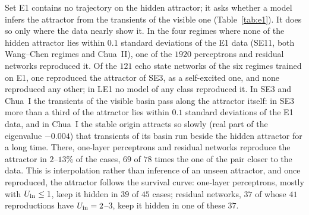 Set E1 contains no trajectory on the hidden attractor; it asks whether a model infers the attractor from the transients of
the visible one (Table~\ref{tab:e1}). It does so only where the data nearly show it. In the four regimes where none of
the hidden attractor lies within $0.1$ standard deviations of the E1 data (SE11, both Wang--Chen regimes and Chua~II), one
of the $1920$ perceptrons and residual networks reproduced it. Of the $121$ echo state networks of the six regimes trained
on E1, one reproduced the attractor of SE3, as a self-excited one, and none reproduced any other; in LE1 no model of any
class reproduced it. In SE3 and Chua~I the transients of the visible basin pass along the
attractor itself: in SE3 more than a third of the attractor lies within $0.1$ standard deviations of the E1 data, and in
Chua~I the stable origin attracts so slowly (real part of the eigenvalue $-0.004$) that transients of its basin run beside
the hidden attractor for a long time. There, one-layer perceptrons and residual networks reproduce the attractor in
$2$--$13\%$ of the cases, $69$ of $78$ times the one of the pair closer to the data. This is interpolation rather than
inference of an unseen attractor, and once reproduced, the attractor follows the survival curve: one-layer perceptrons,
mostly with $U_{\mathrm{in}}\le1$, keep it hidden in $39$ of $45$ cases; residual networks, $37$ of whose $41$ reproductions have
$U_{\mathrm{in}}=2$--$3$, keep it hidden in one of these $37$.

